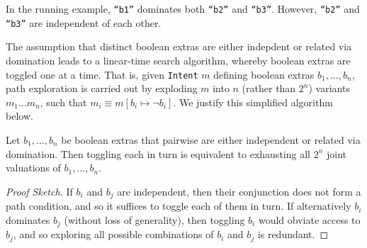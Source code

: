 In the running example, {\tt ``b1''} dominates both {\tt ``b2''} and {\tt ``b3''}. However, {\tt ``b2''} and {\tt ``b3''} are independent of each other.

The assumption that distinct boolean extras are either indepdent or related via domination leads to a linear-time search algorithm, whereby boolean extras are toggled one at a time. That is, given {\tt Intent}  $m$ defining boolean extras $b_1,\ldots,b_n$, path exploration is carried out by exploding $m$ into $n$ (rather than $2^n$) variants $m_1 \ldots m_n$, such that $m_i \equiv m[ b_i \mapsto \neg b_i ]$. We justify this simplified algorithm below.

\begin{lemma} Let $b_1,\ldots,b_n$ be boolean extras that pairwise are either independent or related via domination. Then toggling each in turn is equivalent to exhausting all $2^n$ joint valuations of $b_1,\ldots,b_n$.
\begin{proof}[Proof Sketch]
If $b_i$ and $b_j$ are independent, then their conjunction does not form a path condition, and so it suffices to toggle each of them in turn. If alternatively $b_i$ dominates $b_j$ (without loss of generality), then toggling $b_i$ would obviate access to $b_j$, and so exploring all possible combinations of $b_i$ and $b_j$ is redundant.
\end{proof}
\end{lemma}




